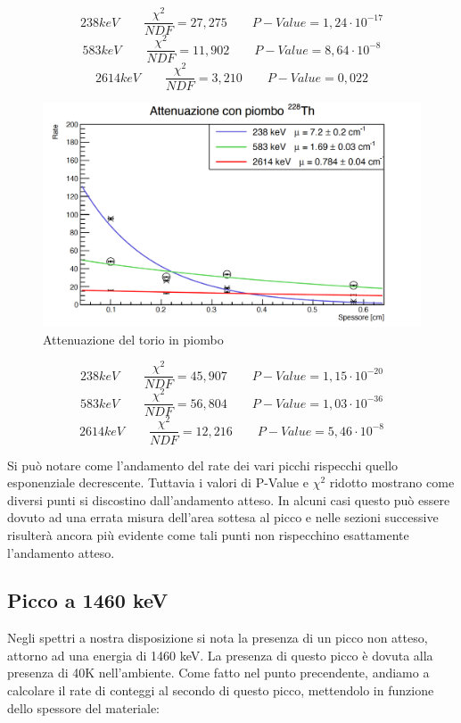 \documentclass[a4paper,10pt]{article}
\begin{document}
$$
	238 keV \qquad \frac{\chi^2}{NDF}  = 27,275 \qquad P-Value = 1,24\cdot 10^{-17}
$$
$$
	583 keV \qquad \frac{\chi^2}{NDF}  = 11,902 \qquad P-Value = 8,64\cdot 10^{-8}
$$
$$
	2614 keV \qquad \frac{\chi^2}{NDF}  = 3,210 \qquad P-Value = 0,022
$$
\begin{figure}[H]
    \centering
    \includegraphics[scale=0.45]{grafici/attenuazionetoriopiombo}
    \caption{Attenuazione del torio in piombo}
\end{figure}
$$
	238 keV \qquad \frac{\chi^2}{NDF}  = 45,907 \qquad P-Value = 1,15\cdot 10^{-20}
$$
$$
	583 keV \qquad \frac{\chi^2}{NDF}  = 56,804 \qquad P-Value = 1,03\cdot 10^{-36}
$$
$$
	2614 keV \qquad \frac{\chi^2}{NDF}  = 12,216 \qquad P-Value = 5,46\cdot 10^{-8}
$$

\noindent Si pu\`o notare come l'andamento del rate dei vari picchi rispecchi quello esponenziale decrescente. Tuttavia i valori di P-Value e $\chi^2$ ridotto mostrano come diversi punti si discostino dall'andamento atteso. In alcuni casi questo può essere dovuto ad una errata misura dell'area sottesa al picco e nelle sezioni successive risulter\`a ancora pi\`u evidente come tali punti non rispecchino esattamente l'andamento atteso.

\subsection{Picco a 1460 keV}

\noindent Negli spettri a nostra disposizione si nota la presenza di un picco non atteso, attorno ad una energia di 1460 keV. La presenza di questo picco \`e dovuta alla presenza di 40K nell'ambiente. Come fatto nel punto precendente, andiamo a calcolare il rate di conteggi al secondo di questo picco, mettendolo in funzione dello spessore del materiale:
\end{document}
